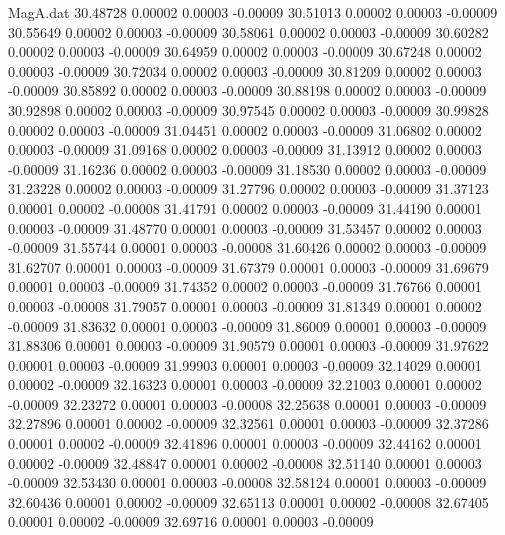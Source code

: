 \begin{filecontents}{MagA.dat}
  30.48728    0.00002    0.00003   -0.00009
  30.51013    0.00002    0.00003   -0.00009
  30.55649    0.00002    0.00003   -0.00009
  30.58061    0.00002    0.00003   -0.00009
  30.60282    0.00002    0.00003   -0.00009
  30.64959    0.00002    0.00003   -0.00009
  30.67248    0.00002    0.00003   -0.00009
  30.72034    0.00002    0.00003   -0.00009
  30.81209    0.00002    0.00003   -0.00009
  30.85892    0.00002    0.00003   -0.00009
  30.88198    0.00002    0.00003   -0.00009
  30.92898    0.00002    0.00003   -0.00009
  30.97545    0.00002    0.00003   -0.00009
  30.99828    0.00002    0.00003   -0.00009
  31.04451    0.00002    0.00003   -0.00009
  31.06802    0.00002    0.00003   -0.00009
  31.09168    0.00002    0.00003   -0.00009
  31.13912    0.00002    0.00003   -0.00009
  31.16236    0.00002    0.00003   -0.00009
  31.18530    0.00002    0.00003   -0.00009
  31.23228    0.00002    0.00003   -0.00009
  31.27796    0.00002    0.00003   -0.00009
  31.37123    0.00001    0.00002   -0.00008
  31.41791    0.00002    0.00003   -0.00009
  31.44190    0.00001    0.00003   -0.00009
  31.48770    0.00001    0.00003   -0.00009
  31.53457    0.00002    0.00003   -0.00009
  31.55744    0.00001    0.00003   -0.00008
  31.60426    0.00002    0.00003   -0.00009
  31.62707    0.00001    0.00003   -0.00009
  31.67379    0.00001    0.00003   -0.00009
  31.69679    0.00001    0.00003   -0.00009
  31.74352    0.00002    0.00003   -0.00009
  31.76766    0.00001    0.00003   -0.00008
  31.79057    0.00001    0.00003   -0.00009
  31.81349    0.00001    0.00002   -0.00009
  31.83632    0.00001    0.00003   -0.00009
  31.86009    0.00001    0.00003   -0.00009
  31.88306    0.00001    0.00003   -0.00009
  31.90579    0.00001    0.00003   -0.00009
  31.97622    0.00001    0.00003   -0.00009
  31.99903    0.00001    0.00003   -0.00009
  32.14029    0.00001    0.00002   -0.00009
  32.16323    0.00001    0.00003   -0.00009
  32.21003    0.00001    0.00002   -0.00009
  32.23272    0.00001    0.00003   -0.00008
  32.25638    0.00001    0.00003   -0.00009
  32.27896    0.00001    0.00002   -0.00009
  32.32561    0.00001    0.00003   -0.00009
  32.37286    0.00001    0.00002   -0.00009
  32.41896    0.00001    0.00003   -0.00009
  32.44162    0.00001    0.00002   -0.00009
  32.48847    0.00001    0.00002   -0.00008
  32.51140    0.00001    0.00003   -0.00009
  32.53430    0.00001    0.00003   -0.00008
  32.58124    0.00001    0.00003   -0.00009
  32.60436    0.00001    0.00002   -0.00009
  32.65113    0.00001    0.00002   -0.00008
  32.67405    0.00001    0.00002   -0.00009
  32.69716    0.00001    0.00003   -0.00009

\end{filecontents}
